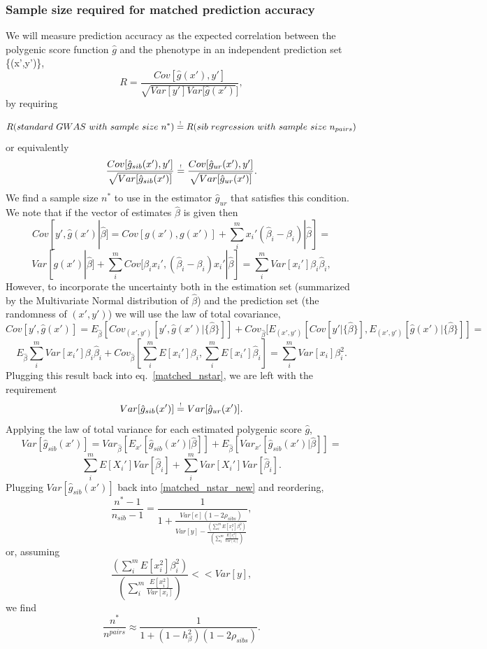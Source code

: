 \documentclass[hidelinks, 12pt]{article}
\begin{document}
\subsubsection{Sample size required for matched prediction accuracy}

We will measure prediction accuracy as the expected correlation between the polygenic score function $\hat{g}$ and the phenotype in an independent prediction set \{(x',y')\},
$$R = \frac{Cov[\hat{g}(x'),y']}{\sqrt{Var[y']Var[\hat{g}(x')}]},$$
by requiring 

\newcommand\reqeq{\mathrel{\stackrel{\makebox[0pt]{\mbox{\normalfont\tiny !}}}{=}}}

$$R(standard~GWAS~with~sample~size~n^*) \reqeq R(sib~regression~with~sample~size~n_{pairs})$$
or equivalently
\begin{equation}
\label{matched_nstar}
\frac{Cov[\hat{g}_{sib}(x'),y']}{\sqrt{Var[\hat{g}_{sib}(x')]}} \reqeq \frac{Cov[\hat{g}_{ur}(x'),y']}{\sqrt{Var[\hat{g}_{ur}(x')]}}.
\end{equation}
We find a sample size $n^*$ to use in the estimator $\hat{g}_{ur}$ that satisfies this condition.  We note that if the vector of estimates $\hat{\beta}$ is given then
$$ Cov[y',\hat{g}(x')|\hat{\beta}]=Cov[g(x'),g(x')]+\sum_i^m{x_i'(\hat{\beta}_i-\beta_i)}|\hat{\beta}] = $$
$$Var[g(x')|\hat{\beta}]+\sum_i^m{Cov[\beta_ix_i',(\hat{\beta}_i-\beta_i)x_i'}|\hat{\beta}]=\sum_i^mVar[x_i']\beta_i\hat{\beta}_i,$$
However, to incorporate the uncertainty both in the estimation set (summarized by the Multivariate Normal distribution of $\hat{\beta}$) and the prediction set (the randomness of $(x',y')$) we will use the law of total covariance,
$$ Cov[y',\hat{g}(x')]=E_{\hat{\beta}}[Cov_{(x',y')}[y',\hat{g}(x')|\{\hat{\beta}\}]]+Cov_{\hat{\beta}}[E_{(x',y')}[Cov[y'|\{\hat{\beta}\}],E_{(x',y')}[\hat{g}(x')|\{\hat{\beta}\}]]=$$
$$E_{\hat{\beta}}\sum_i^mVar[x_i']\beta_i\hat{\beta}_i+Cov_{\hat{\beta}}[\sum_i^mE[x_i']\beta_i,\sum_i^mE[x_i']\hat{\beta}_i]=\sum_i^mVar[x_i]\beta_i^2.$$
Plugging this result back into eq.~\ref{matched_nstar}, we are left with the requirement 
\begin{equation}
\label{matched_nstar_new}
Var[\hat{g}_{sib}(x')] \reqeq Var[\hat{g}_{ur}(x')].
\end{equation}
Applying the law of total variance for each estimated polygenic score $\hat{g}$,
$$Var[\hat{g}_{sib}(x')] =Var_{\hat{\beta}}[E_{x'}[\hat{g}_{sib}(x')|\hat{\beta}]]+E_{\hat{\beta}}[Var_{x'}[\hat{g}_{sib}(x')|\hat{\beta}]] =$$
$$\sum_i^mE[X_i']Var[\hat{\beta}_i]+\sum_i^mVar[X_i']Var[\hat{\beta}_i].$$
Plugging $Var[\hat{g}_{sib}(x')]$ back into \ref{matched_nstar_new} and reordering, 
$$\frac{n^*-1}{n_{sib}-1}=\frac{1}{1+\frac{Var[e](1-2\rho_{sibs})}{Var[y]-\frac{(\sum_i^mE[x_i^2]\beta_i^2)}{(\sum_i^m\frac{E[x_i^2]}{Var[x_i]})}}},$$
or, assuming 
$$\frac{(\sum_i^mE[x_i^2]\beta_i^2)}{(\sum_i^m\frac{E[x_i^2]}{Var[x_i]})} << Var[y],$$ 
we find
\begin{equation}
\label{final_nstar_just_direct}
\frac{n^*}{n^{pairs}} \approx \frac{1}{1+(1-h_{\beta}^2)(1-2\rho_{sibs})}.
\end{equation}
\end{document}
